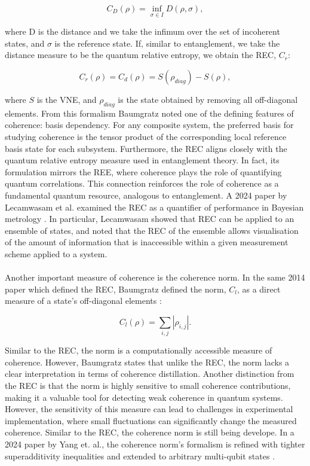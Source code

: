 \documentclass[12pt,a4paper]{article}
\begin{document}
\begin{equation}
    C_D(\rho) = \inf_{\sigma \in I} D(\rho,\sigma),
\end{equation}

where D is the distance and we take the infimum over the set of incoherent states, and $\sigma$ is the reference state. If, similar to entanglement, we take the distance measure to be the quantum relative entropy, we obtain the REC, $C_r$:

\begin{equation}
    C_r(\rho) = C_d(\rho) = S(\rho_{diag}) - S(\rho),
\end{equation}

where $S$ is the VNE, and $\rho_{diag}$ is the state obtained by removing all off-diagonal elements. From this formalism Baumgratz noted one of the defining features of coherence: basis dependency. For any composite system, the preferred basis for studying coherence is the tensor product of the corresponding local reference basis state for each subsystem. Furthermore, the REC aligns closely with the quantum relative entropy measure used in entanglement theory. In fact, its formulation mirrors the REE, where coherence plays the role of quantifying quantum correlations. This connection reinforces the role of coherence as a fundamental quantum resource, analogous to entanglement. A 2024 paper by Lecamwasam et al. examined the REC as a quantifier of performance in Bayesian metrology \cite{Coherence2024-REC_development}. In particular, Lecamwasam showed that REC can be applied to an ensemble of states, and noted that the REC of the ensemble allows visualisation of the amount of information that is inaccessible within a given measurement scheme applied to a system. \\
\\
Another important measure of coherence is the coherence norm. In the same 2014 paper which defined the REC, Baumgratz defined the norm, $C_l$, as a direct measure of a state's off-diagonal elements \cite{Coherence2014-seed}:

\begin{equation}
    C_l(\rho) = \sum_{i,j}|\rho_{i,j}|.
\end{equation}

Similar to the REC, the norm is a computationally accessible measure of coherence. However, Baumgratz states that unlike the REC, the norm lacks a clear interpretation in terms of coherence distillation. Another distinction from the REC is that the norm is highly sensitive to small coherence contributions, making it a valuable tool for detecting weak coherence in quantum systems. However, the sensitivity of this measure can lead to challenges in experimental implementation, where small fluctuations can significantly change the measured coherence. Similar to the REC, the coherence norm is still being develope. In a 2024 paper by Yang et. al., the coherence norm's formalism is refined with tighter superadditivity inequalities and extended to arbitrary multi-qubit states \cite{Coherence2024-Norm_refinement}.
\end{document}

